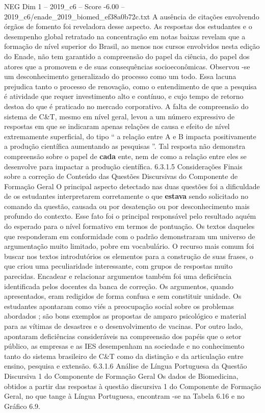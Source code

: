 \begin{textsample}{NEG Dim 1 – 2019\_c6 – Score -6.00 – 2019\_c6/enade\_2019\_biomed\_ef38a0b72c.txt}
A ausência de citações envolvendo órgãos de fomento foi reveladora desse aspecto.
As respostas dos estudantes e o desempenho global retratado na concentração em notas baixas revelam que a formação de nível superior do Brasil, ao menos nos cursos envolvidos nesta edição do Enade, não tem garantido a compreensão do papel da ciência, do papel dos atores que a promovem e de suas consequências socioeconômicas.
Observou -se um desconhecimento generalizado do processo como um todo.
Essa lacuna prejudica tanto o processo de renovação, como o entendimento de que a pesquisa é atividade que requer investimento alto e contínuo, e cujo tempo de retorno destoa do que é praticado no mercado corporativo.
A falta de compreensão do sistema de C\&T, mesmo em nível geral, levou a um número expressivo de respostas em que se indicaram apenas relações de causa e efeito de nível extremamente superficial, do tipo “ a relação entre A e B impacta positivamente a produção científica aumentando as pesquisas ”.
Tal resposta não demonstra compreensão sobre o papel de \textbf{cada} ente, nem de como a relação entre eles se desenvolve para impactar a produção científica. 6.3.1.5 Considerações Finais sobre a correção de Conteúdo das Questões Discursivas do Componente de Formação Geral O principal aspecto detectado nas duas questões foi a dificuldade de os estudantes interpretarem corretamente o que \textbf{estava} sendo solicitado no comando da questão, causada ou por desatenção ou por desconhecimento mais profundo do contexto.
Esse fato foi o principal responsável pelo resultado aquém do esperado para o nível formativo em termos de pontuação.
Os textos daqueles que responderam em conformidade com o padrão demonstraram um universo de argumentação muito limitado, pobre em vocabulário.
O recurso mais comum foi buscar nos textos introdutórios os elementos para a construção de suas frases, o que criou uma peculiaridade interessante, com grupos de respostas muito parecidas.
Encadear e relacionar argumentos também foi uma deficiência identificada pelos docentes da banca de correção.
Os argumentos, quando apresentados, eram redigidos de forma confusa e sem constituir unidade.
Os estudantes apontaram como viés a preocupação social sobre os problemas abordados ; são bons exemplos as propostas de amparo psicológico e material para as vítimas de desastres e o desenvolvimento de vacinas.
Por outro lado, apontaram deficiências consideráveis na compreensão dos papéis que o setor público, as empresas e as IES desempenham na sociedade e no conhecimento tanto do sistema brasileiro de C\&T como da distinção e da articulação entre ensino, pesquisa e extensão. 6.3.1.6 Análise de Língua Portuguesa da Questão Discursiva 1 do Componente de Formação Geral Os dados de Biomedicina, obtidos a partir das respostas à questão discursiva 1 do Componente de Formação Geral, no que tange à Língua Portuguesa, encontram -se na Tabela 6.16 e no Gráfico 6.9.

\end{textsample}
